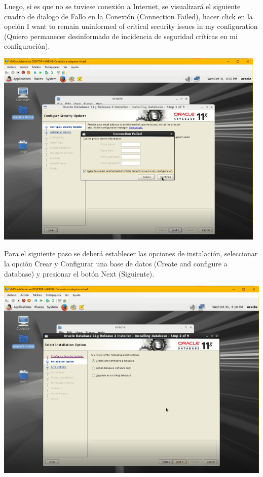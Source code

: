 Luego, si es que no se tuviese conexión a Internet, se visualizará el siguiente cuadro de dialogo de Fallo en la Conexión (Connection Failed), hacer click en la opción I want to remain uninformed of critical security issues in my configuration (Quiero permanecer desinformado de incidencia de seguridad críticas en mi configuración).
\begin{center}
	\includegraphics[width=13cm]{./Imagenes/71} 
\end{center}

\vspace{\baselineskip}

Para el siguiente paso se deberá establecer las opciones de instalación, seleccionar la opción Crear y Configurar una base de datos (Create and configure a database) y presionar el botón Next (Siguiente).
\begin{center}
	\includegraphics[width=13.3cm]{./Imagenes/72} 
\end{center}

